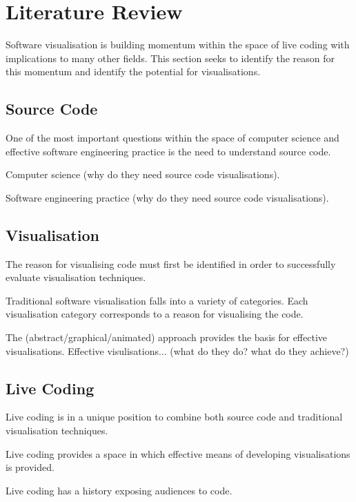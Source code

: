 
\chapter{Literature Review}
\label{cha:literaturereview}

Software visualisation is building momentum within the space of live coding with implications to many other fields. This section seeks to identify the reason for this momentum and identify the potential for visualisations.

\section{Source Code}

One of the most important questions within the space of computer science and effective software engineering practice is the need to understand source code.

Computer science (why do they need source code visualisations).

Software engineering practice (why do they need source code visualisations).


\section{Visualisation}

The reason for visualising code must first be identified in order to successfully evaluate visualisation techniques.

Traditional software visualisation falls into a variety of categories. Each visualisation category corresponds to a reason for visualising the code.

The (abstract/graphical/animated) approach provides the basis for effective visualisations. Effective visulisations... (what do they do? what do they achieve?)


\section{Live Coding}

Live coding is in a unique position to combine both source code and traditional visualisation techniques.

Live coding provides a space in which effective means of developing visualisations is provided.

Live coding has a history exposing audiences to code.

